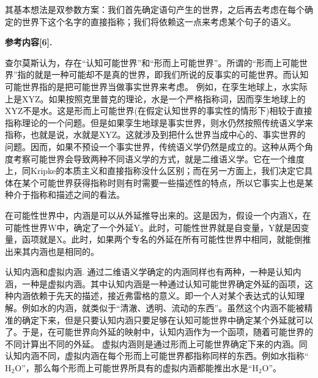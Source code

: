 \documentclass{article}
\begin{document}
其基本想法是{\heiti 双参数方案}：我们首先确定语句产生的世界，之后再去考虑在每个确定的世界下这个名字的直接指称；我们将依赖这一点来考虑某个句子的语义。

\textbf{\kaishu 参考内容[6].}
{ 查尔莫斯认为，存在“认知可能世界”和“形而上可能世界”。所谓的“形而上可能世界”指的就是一种可能却不是真的世界，即我们所说的反事实的可能世界。而认知可能世界指的是把可能世界当做事实世界来考虑。 例如，在孪生地球上，水实际上是XYZ。如果按照克里普克的理论，水是一个严格指称词，因而孪生地球上的XYZ不是水。这是形而上可能世界(在假定认知世界的事实性的情形下)相较于直接指称理论的一个问题。但是如果孪生地球是事实世界，则水仍然按照传统语义学来指称，也就是说，水就是XYZ。这就涉及到把什么世界当成中心的、事实世界的问题。因而，如果不预设一个事实世界，传统语义学仍然是成立的。这种从两个角度考察可能世界会导致两种不同语义学的方式，就是二维语义学。它在一个维度上，同Kripke的本质主义和直接指称没什么区别；而在另一方面上，我们决定它具体在某个可能世界获得指称时则有时需要一些描述性的特点，所以它事实上也是某种介于指称和描述之间的看法。

在可能性世界中，内涵是可以从外延推导出来的。这是因为，假设一个内涵X，在可能性世界W中，确定了一个外延Y。此时，可能性世界就是自变量，Y就是因变量，函项就是X。此时，如果两个专名的外延在所有可能性世界中相同，就能倒推出来其内涵也是相同的。

{\heiti 认知内涵和虚拟内涵.} 通过二维语义学确定的内涵同样也有两种，一种是认知内涵，一种是虚拟内涵。其中认知内涵是一种通过认知可能世界确定外延的函项，这种内涵依赖于先天的描述，接近弗雷格的意义。即一个人对某个表达式的认知理解。例如水的内涵，就类似于“清澈、透明、流动的东西”。虽然这个内涵不能被精准的确定下来，但是只要认知内涵只要足够在认知可能世界中确定某个外延就可以了。于是，在可能世界向外延的映射中，认知内涵作为一个函项，随着可能世界的不同计算出不同的外延。 虚拟内涵则是通过形而上可能世界确定下来的内涵。同认知内涵不同，虚拟内涵在每个形而上可能世界都指称同样的东西。例如水指称“$\mathrm{H_2O}$”，那么每个形而上可能世界所具有的虚拟内涵都能推出水是“$\mathrm{H_2O}$”。

}
\end{document}
